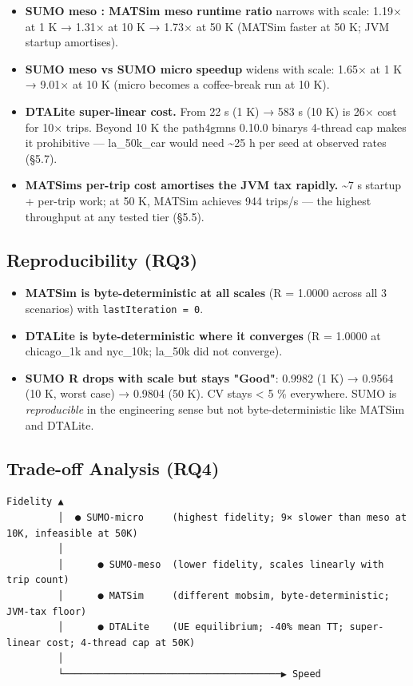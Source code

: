 \begin{itemize}
\tightlist
\item
  \textbf{SUMO meso : MATSim meso runtime ratio} narrows with scale:
  1.19× at 1 K → 1.31× at 10 K → 1.73× at 50 K (MATSim faster at 50 K;
  JVM startup amortises).
\item
  \textbf{SUMO meso vs SUMO micro speedup} widens with scale: 1.65× at 1
  K → 9.01× at 10 K (micro becomes a coffee-break run at 10 K).
\item
  \textbf{DTALite super-linear cost.} From 22 s (1 K) → 583 s (10 K) is
  26× cost for 10× trips. Beyond 10 K the path4gmns 0.10.0
  binary\textquotesingle s 4-thread cap makes it prohibitive ---
  la\_50k\_car would need \textasciitilde25 h per seed at observed rates
  (§5.7).
\item
  \textbf{MATSim\textquotesingle s per-trip cost amortises the JVM tax
  rapidly.} \textasciitilde7 s startup + per-trip work; at 50 K, MATSim
  achieves 944 trips/s --- the highest throughput at any tested tier
  (§5.5).
\end{itemize}

\subsection{Reproducibility (RQ3)}\label{444-reproducibility-rq3}

\begin{itemize}
\tightlist
\item
  \textbf{MATSim is byte-deterministic at all scales} (R = 1.0000 across
  all 3 scenarios) with \texttt{lastIteration\ =\ 0}.
\item
  \textbf{DTALite is byte-deterministic where it converges} (R = 1.0000
  at chicago\_1k and nyc\_10k; la\_50k did not converge).
\item
  \textbf{SUMO R drops with scale but stays "Good"}: 0.9982 (1 K) →
  0.9564 (10 K, worst case) → 0.9804 (50 K). CV stays \textless{} 5 \%
  everywhere. SUMO is \emph{reproducible} in the engineering sense but
  not byte-deterministic like MATSim and DTALite.
\end{itemize}

\subsection{Trade-off Analysis
(RQ4)}\label{445-trade-off-analysis-rq4}

\begin{verbatim}
Fidelity ▲
         │  ● SUMO-micro     (highest fidelity; 9× slower than meso at 10K, infeasible at 50K)
         │
         │      ● SUMO-meso  (lower fidelity, scales linearly with trip count)
         │      ● MATSim     (different mobsim, byte-deterministic; JVM-tax floor)
         │      ● DTALite    (UE equilibrium; -40% mean TT; super-linear cost; 4-thread cap at 50K)
         │
         └──────────────────────────────────────▶ Speed
\end{verbatim}

